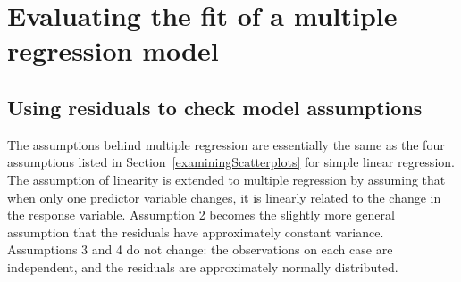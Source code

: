 \section{Evaluating the fit of a multiple regression model}

\subsection{Using residuals to check model assumptions}

The assumptions behind multiple regression are essentially the same as the four assumptions listed in Section~\ref{examiningScatterplots} for simple linear regression. The assumption of linearity is extended to multiple regression by assuming that when only one predictor variable changes, it is linearly related to the change in the response variable.  Assumption 2 becomes the slightly more general assumption that the residuals have approximately constant variance. Assumptions 3 and 4 do not change: the observations on each case are independent, and the residuals are approximately normally distributed.

